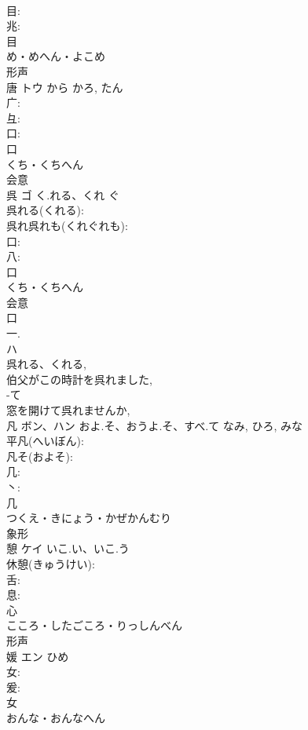 \documentclass[8pt]{extreport}
\begin{document}
\begin{CJK}{UTF8}{min}
\\	目: 
\\	兆: 
\\	目	
\\	め・めへん・よこめ	
\\	形声 
\\	唐	トウ	から	かろ, たん	
\\	广: 
\\	彑: 
\\	口: 
\\	口	
\\	くち・くちへん	
\\	会意 
\\	呉	ゴ	く.れる、くれ	ぐ	
\\	呉れる(くれる): 
\\	呉れ呉れも(くれぐれも): 
\\	口: 
\\	八: 
\\	口	
\\	くち・くちへん	
\\	会意 
\\	口 
\\	一. 
\\	ハ 
\\	呉れる、くれる, 
\\	伯父がこの時計を呉れました, 
\\	-て 
\\	窓を開けて呉れませんか, 
\\	凡	ボン、ハン	およ.そ、おうよ.そ、すべ.て	なみ, ひろ, みな	
\\	平凡(へいぼん): 
\\	凡そ(およそ): 
\\	几: 
\\	丶: 
\\	几	
\\	つくえ・きにょう・かぜかんむり	
\\	象形 
\\	憩	ケイ	いこ.い、いこ.う		
\\	休憩(きゅうけい): 
\\	舌: 
\\	息: 
\\	心	
\\	こころ・したごころ・りっしんべん	
\\	形声 
\\	媛	エン	ひめ		
\\	女: 
\\	爰: 
\\	女	
\\	おんな・おんなへん	

\end{CJK}
\end{document}
